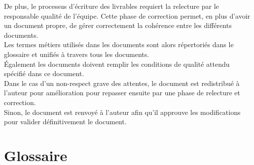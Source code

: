 De plus, le processus d'écriture des livrables requiert la relecture par le
responsable qualité de l'équipe. Cette phase de correction permet, en plus
d'avoir un document propre, de gérer correctement la cohérence entre les
différents documents. \\

Les termes métiers utilisés dans les documents sont alors répertoriés dans le
glossaire et unifiés à travers tous les documents. \\
Également les documents doivent remplir les conditions de qualité attendu
spécifié dans ce document. \\

Dans le cas d'un non-respect grave des attentes, le document est redistribué à
l'auteur pour amélioration pour repasser ensuite par une phase de relecture et
correction. \\
Sinon, le document est renvoyé à l'auteur afin qu'il approuve les modifications
pour valider définitivement le document. \\

\section{Glossaire}




